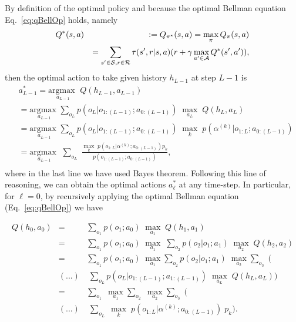 By definition of the optimal policy and because the optimal Bellman equation Eq.~\eqref{eq:qBellOp} holds, namely
\begin{eqnarray}
Q^{*}(s,a)&&:=Q_{\pi^*}(s,a)=\max_\pi Q_\pi(s,a)\\
&&=\sum_{s'\in\mathcal{S},r\in\mathcal{R}}\tau(s',r|s,a)(r+\gamma \max_{a'\in\mathcal{A}}Q^{*}(s',a')),
\end{eqnarray}
then the optimal action to take given history $h_{L-1}$ at step $L-1$ is
{\small
\begin{equation}\begin{aligned}
  &a^{*}_{L-1} = \underset{a_{L-1}}{\text{argmax }} \; Q(h_{L-1}, a_{L-1}) \\
  &= \underset{a_{L-1}}{\text{argmax }} \sum_{o_L} p(o_{L}|o_{1:(L-1)}; a_{0:(L-1)}) \; \max_{a_{L}}  \; Q(h_L, a_L) \\
  &= \underset{a_{L-1}}{\text{argmax }} \sum_{o_L} p(o_{L}|o_{1:(L-1)}; a_{0:(L-1)}) \; \max_{k} \; p( \alpha ^{(k)} | o_{1:L}; a_{0:(L-1)}) \\
  &= \underset{a_{L-1}}{\text{argmax }} \; \sum_{o_L}  \; \frac{\max_{k} \; p(o_{1:L} | \alpha ^{(k)}; a_{0:(L-1)}) p_k}{p(o_{1:(L-1)}; a_{0:(L-1)}) }, \\
\end{aligned}\end{equation}
}%
where in the last line we have used Bayes theorem. Following this line of reasoning, we can obtain the optimal actions $a^{*}_{\ell}$ at any time-step. In particular, for $\ell=0$, by recursively applying the optimal Bellman equation (Eq.~\eqref{eq:qBellOp}) we have

\begin{eqnarray}\label{eq:OptQLL}
Q(h_0, a_0)&=& \sum_{o_1} p(o_1; a_0) \; \underset{a_1}{\max } \; Q(h_1, a_1)  \\ \nonumber
&=& \sum_{o_1} p(o_1; a_0) \; \underset{a_1}{\max } \; \sum_{o_{2}} p(o_{2}|o_{1}; a_1) \; \underset{a_2}{\max } \; Q(h_2, a_2) \\ \nonumber
& = &  \sum_{o_1} p(o_1; a_0) \; \underset{a_1}{\max } \sum_{o_{2}} p(o_{2}|o_{1}; a_1) \; \underset{a_2}{\max } \sum_{o_3} \; \Big( \\ \nonumber
& (...) & \; \sum_{o_{L}}  p(o_L|o_{1:(L-1)}; a_{1:(L-1)}) \; \underset{a_L}{\max}\; Q(h_L, a_L)\Big) \\  \nonumber
&=& \sum_{o_1} \; \underset{a_1}{\max } \sum_{o_{2}} \; \underset{a_2}{\max } \sum_{o_3} \; \Big( \\ \nonumber
& (...) & \; \sum_{o_{L}}  \; \underset{k}{\max}\; p(o_{1:L}|\alpha^{(k)}; a_{0:(L-1)}) \; p_k \Big). \\  \nonumber
\end{eqnarray}

